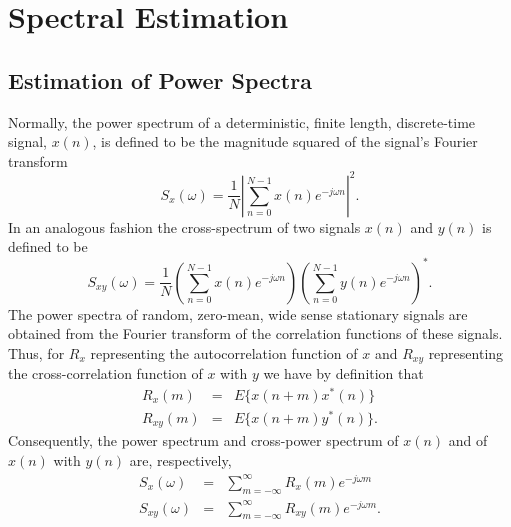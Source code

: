 \chapter{Spectral Estimation}
\section{Estimation of Power Spectra}

	Normally, the power spectrum of a deterministic,
finite length, discrete-time signal, $x(n)$, is defined to
be the magnitude squared of the signal's Fourier transform
%
\begin{equation}
S_x(\omega)=\frac{1}{N}|\sum_{n=0}^{N-1}x(n)e^{-j\omega n}|^2.
\label{e.sp.1}
\end{equation}
%
In an analogous fashion the cross-spectrum of two signals 
$x(n)$ and $y(n)$ is defined to be
%
\begin{equation}
S_{xy}(\omega)=\frac{1}{N}(\sum_{n=0}^{N-1}x(n)e^{-j\omega n})(\sum_{n=0}^{N-1}y(n)e^{-j\omega n})^*.
\label{e.sp.2}
\end{equation}
%
The power spectra of random, zero-mean, wide sense stationary signals
are obtained from the Fourier transform of the correlation functions
of these signals.  Thus, for $R_x$ representing the autocorrelation
function of $x$ and $R_{xy}$ representing the cross-correlation function of
$x$ with $y$ we have by definition that
%
\begin{eqnarray}
R_x(m)&=&E\{x(n+m)x^*(n)\}\label{e.sp.3}\\
R_{xy}(m)&=&E\{x(n+m)y^*(n)\}.
\label{e.sp.4}
\end{eqnarray}
%
Consequently, the power spectrum and cross-power spectrum 
of $x(n)$ and of $x(n)$ with $y(n)$ are, respectively,
%
\begin{eqnarray}
S_x(\omega)&=&\sum_{m=-\infty}^{\infty}R_x(m)e^{-j\omega m}
\label{e.sp.5}\\
S_{xy}(\omega)&=&\sum_{m=-\infty}^{\infty}R_{xy}(m)e^{-j\omega m}.
\label{e.sp.6}
\end{eqnarray}
%

